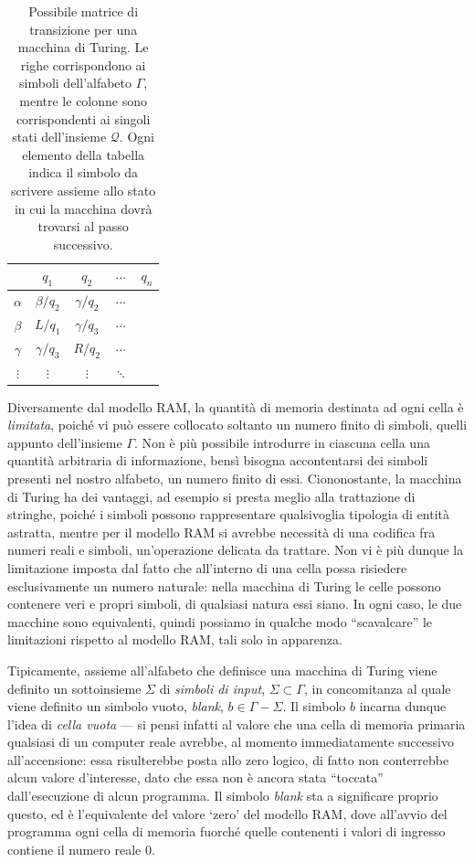 \documentclass[10pt]{\classname}
\theoremstyle{newlinethm}
\theoremstyle{theorem}
\theoremstyle{definition}
\theoremstyle{definition}
\theoremstyle{definition}
\theoremstyle{definition}
\begin{document}
\begin{table}[ht]
\centering
\begin{tabular}{c|cccc}
    & $q_1$ & $q_2$ & $\cdots$ & $q_n$ \\
    \hline
$\alpha$ & $\beta/q_2$ & $\gamma/q_2$ & $\cdots$ & \\
$\beta$ & $L/q_1$ & $\gamma/q_3$ & $\cdots$ & \\
$\gamma$ & $\gamma/q_3$ & $R/q_2$ & $\cdots$ & \\
$\vdots$ & $\vdots$ & $\vdots$ & $\ddots$ &    
\end{tabular}
\caption{Possibile matrice di transizione per una macchina di Turing. Le righe
corrispondono ai simboli dell'alfabeto $\Gamma$, mentre le colonne sono
corrispondenti ai singoli stati dell'insieme $\mathcal
Q$. Ogni elemento della tabella indica il simbolo da scrivere assieme allo stato in cui la
macchina dovrà trovarsi al passo successivo.}\label{tab:matriceTransizione}
\end{table}
\bigskip


Diversamente dal modello RAM, la quantità di memoria destinata ad ogni cella è
\emph{limitata}, poiché vi può essere collocato soltanto un numero finito di
simboli, quelli appunto dell'insieme $\Gamma$. Non è più possibile introdurre in ciascuna cella una quantità arbitraria di informazione, bensì bisogna accontentarsi dei simboli presenti
nel nostro alfabeto, un numero finito di essi. Ciononostante, la macchina di
Turing ha dei vantaggi, ad esempio si presta meglio alla trattazione di
stringhe, poiché i simboli possono rappresentare qualsivoglia tipologia di
entità astratta, mentre per il modello RAM si avrebbe necessità di una codifica
fra numeri reali e simboli, un'operazione delicata da trattare. Non vi è più dunque la limitazione
imposta dal fatto che all'interno di una cella possa risiedere esclusivamente
un numero naturale: nella macchina di Turing le celle possono contenere veri e
propri simboli, di qualsiasi natura essi siano. In ogni caso, le due macchine
sono equivalenti, quindi possiamo in qualche modo ``scavalcare'' le limitazioni
rispetto al modello RAM, tali solo in apparenza.

Tipicamente, assieme all'alfabeto che definisce una macchina di Turing viene definito
un sottoinsieme $\Sigma$ di \emph{simboli di input}, $\Sigma \subset \Gamma$, in
concomitanza al quale viene definito un simbolo vuoto, \emph{blank}, $b \in
\Gamma - \Sigma$. Il simbolo $b$ incarna dunque l'idea di \emph{cella
vuota} --- si pensi infatti al valore che una cella di memoria primaria
qualsiasi di un computer reale avrebbe, al momento immediatamente successivo
all'accensione: essa risulterebbe posta allo zero logico, di fatto non
conterrebbe alcun valore d'interesse, dato che essa non è ancora stata
``toccata'' dall'esecuzione di alcun programma. Il simbolo \emph{blank} sta a
significare proprio questo, ed è l'equivalente del valore `zero' del modello
RAM, dove all'avvio del programma ogni cella di memoria fuorché quelle
contenenti i valori di ingresso contiene il numero reale $0$.
\end{document}
